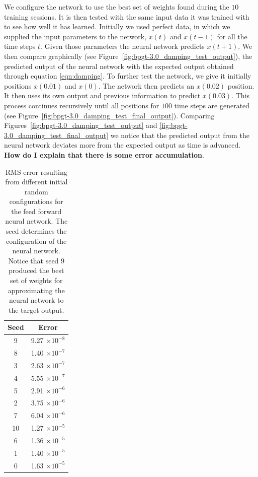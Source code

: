 \documentclass[11pt]{article}
\begin{document}
We configure the network to use the best set of weights found during the $10$ training sessions. It is then tested with the same input
data it was trained with to see how well it has learned. Initially we used perfect data, in which we supplied the input parameters to
the network, $x(t)$ and $x(t-1)$ for all the time steps $t$. Given those parameters the neural network predicts $x(t+1)$. We then
compare graphically (see Figure~\ref{fig:bpgt-3.0_damping_test_output}), the predicted output of the neural network with the expected
output obtained through equation \ref{eqn:damping}. To further test the network, we give it initially positions $x(0.01)$ and $x(0)$.
The network then predicts an $x(0.02)$ position. It then uses its own output and previous information to predict $x(0.03)$. This process
continues recursively until all positions for $100$ time steps are generated (see Figure~\ref{fig:bpgt-3.0_damping_test_final_output}).
Comparing Figures~\ref{fig:bpgt-3.0_damping_test_output} and \ref{fig:bpgt-3.0_damping_test_final_output} we notice that the predicted
output from the neural network deviates more from the expected output as time is advanced. \textbf{How do I explain that there is some
error accumulation}.


\begin{table}
	\begin{center}
		\begin{tabular}{|c|c|}
		\hline
		Seed & Error\\
		\hline
		9 & 9.27 $\times 10^{-8}$\\
		8 & 1.40 $\times 10^{-7}$\\
		3 & 2.63 $\times 10^{-7}$\\
		4 & 5.55 $\times 10^{-7}$\\
		5 & 2.91 $\times 10^{-6}$\\
		2 & 3.75 $\times 10^{-6}$\\
		7 & 6.04 $\times 10^{-6}$\\
		10 & 1.27 $\times 10^{-5}$\\
		6 & 1.36 $\times 10^{-5}$\\
		1 & 1.40 $\times 10^{-5}$\\
		0 & 1.63 $\times 10^{-5}$\\
		\hline
		\end{tabular}
	\end{center}
	\caption{RMS error resulting from different initial random configurations for the feed forward neural network. The seed determines the configuration of the neural network. Notice that seed $9$ produced the best set of weights for approximating the neural network to the target output.}
	\label{tab:training_seeds}
\end{table}
\end{document}
